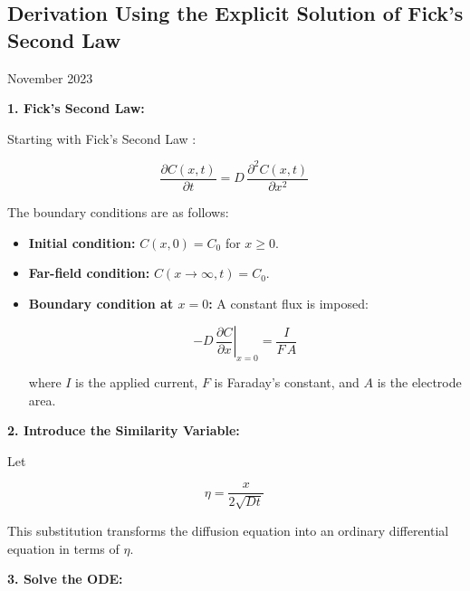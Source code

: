 \documentclass{article}
\begin{document}
\begin{titlepage}
\vspace*{0.5cm}
\begin{center}

\vspace*{2cm}
    \section*{Derivation Using the Explicit Solution of Fick's Second Law}
    \vfill
    November 2023
\end{center}
\end{titlepage}
\newpage

\textbf{1. Fick's Second Law:}

Starting with Fick's Second Law \cite{Fick1855}:

\begin{equation}\label{eq:con:1}
\frac{\partial C(x,t)}{\partial t} = D\,\frac{\partial^2 C(x,t)}{\partial x^2}\,
\end{equation}

The boundary conditions are as follows:
\begin{itemize}[leftmargin=2.5em]
    \item \textbf{Initial condition:} \( C(x,0) = C_0 \) for \( x \ge 0 \).
    \item \textbf{Far-field condition:} \( C(x \to \infty, t) = C_0 \).
    \item \textbf{Boundary condition at \( x=0 \):} A constant flux is imposed:
    
    \begin{equation}\label{eq:con:2}
    -D\,\left.\frac{\partial C}{\partial x}\right|_{x=0} = \frac{I}{F\,A}\,
    \end{equation}
    
    where \(I\) is the applied current, \(F\) is Faraday's constant, and \(A\) is the electrode area.
\end{itemize}

\vspace{1ex}
\textbf{2. Introduce the Similarity Variable:}

Let

\begin{equation}\label{eq:con:3}
\eta = \frac{x}{2\sqrt{Dt}}\,
\end{equation}

This substitution transforms the diffusion equation into an ordinary differential equation in terms of \(\eta\).

\vspace{1ex}
\textbf{3. Solve the ODE:}
\end{document}
